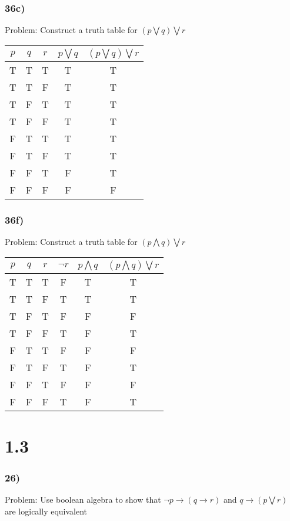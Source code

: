 \documentclass{article}
\begin{document}
\subsubsection*{36c)}
Problem: Construct a truth table for $(p \bigvee q) \bigvee r$
\begin{center}
\begin{tabular}{|c|c|c|c|c|}
\hline
$p$ & $q$ & $r$ & $p \bigvee q$ & $(p \bigvee q) \bigvee r$ \\
\hline
T & T & T & T & T \\
T & T & F & T & T \\
T & F & T & T & T \\
T & F & F & T & T \\
F & T & T & T & T \\
F & T & F & T & T \\
F & F & T & F & T \\
F & F & F & F & F \\
\hline
\end{tabular}
\end{center}
\subsubsection*{36f)}
Problem: Construct a truth table for $(p \bigwedge q) \bigvee r$
\begin{center}
\begin{tabular}{|c|c|c|c|c|c|}
\hline
$p$ & $q$ & $r$ & $\neg r$  & $p \bigwedge q$ & $(p \bigwedge q) \bigvee r$ \\
\hline
T & T & T & F & T & T\\
T & T & F & T & T & T\\
T & F & T & F & F & F\\
T & F & F & T & F & T\\
F & T & T & F & F & F\\
F & T & F & T & F & T\\
F & F & T & F & F & F\\
F & F & F & T & F & T\\
\hline
\end{tabular}
\end{center}
\section*{1.3}
\subsubsection*{26)}
Problem: Use boolean algebra to show that $\neg p \rightarrow (q \rightarrow r)$ and $q \rightarrow (p \bigvee r)$ are logically equivalent
\end{document}
